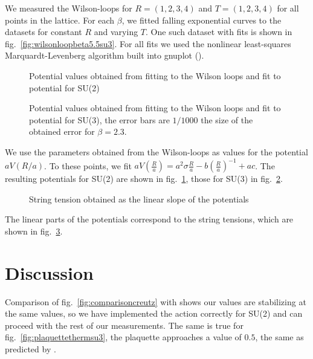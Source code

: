 \documentclass[%
 reprint,
 amsmath,amssymb,
 aps,
]{revtex4-1}
\begin{document}
We measured the Wilson-loops for $R=(1,2,3,4)$ and $T=(1,2,3,4)$ for all points in the lattice. For each $\beta$, we fitted falling exponential curves to the datasets for constant $R$ and varying $T$. One such dataset with fits is shown in fig.~\ref{fig:wilsonloopbeta5.5su3}. For all fits we used the nonlinear least-squares Marquardt-Levenberg algorithm built into gnuplot (\citet{gnuplotdoc}).



\begin{figure}
	\centering
	
	\caption[Potentials obtained using SU(2)]{Potential values obtained from fitting to the Wilson loops and fit to potential for SU(2)}
	\label{fig:fittedpotentialssu2}
\end{figure} 


\begin{figure}
	\centering
	
	\caption[Potentials obtained using SU(3)]{Potential values obtained from fitting to the Wilson loops and fit to potential for SU(3), the error bars are $1/1000$ the size of the obtained error for $\beta=2.3$.}
	\label{fig:fittedpotentialssu3}
\end{figure} 

We use the parameters obtained from the Wilson-loops as values for the potential $aV(R/a)$. To these points, we fit $aV\left(\frac{R}{a}\right)=a^2\sigma \frac{R}{a}-b\left(\frac{R}{a}\right)^{-1}+ac$. The resulting potentials for SU(2) are shown in fig.~\ref{fig:fittedpotentialssu2}, those for SU(3) in fig.~\ref{fig:fittedpotentialssu3}.


\begin{figure}
	\centering
	
	\caption[String tension obtained from potential]{String tension obtained as the linear slope of the potentials}
	\label{fig:stringtension}
\end{figure}

The linear parts of the potentials correspond to the string tensions, which are shown in fig.~\ref{fig:stringtension}.


\section{Discussion}

Comparison of fig.~\ref{fig:comparisoncreutz} with \citet{creutzsu2} shows our values are stabilizing at the same values, so we have implemented the action correctly for SU(2) and can proceed with the rest of our measurements. The same is true for fig.~\ref{fig:plaquettethermsu3}, the plaquette approaches a value of $0.5$, the same as predicted by \citet{lepagelqcd}. 
\end{document}
